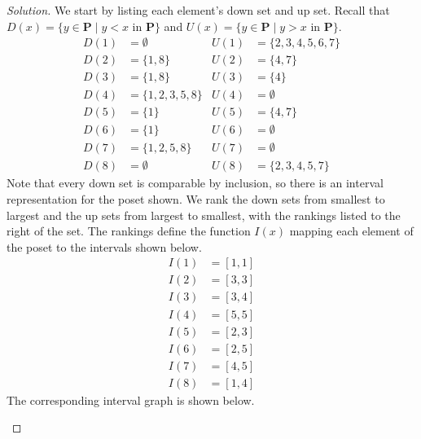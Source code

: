 \documentclass[12pt]{article}
\theoremstyle{definition}
\newenvironment{solution}{
  \begin{proof}[Solution]
    \vspace{-8px}
    \setlength{\parskip}{4px}
    \setlength{\parindent}{0px}
}{
\end{proof}
}
\begin{document}
  \begin{solution}
    We start by listing each element's down set and up set.
    Recall that \(D \left( x \right) = \{y \in \textbf{P} \mid y < x \text{ in } \textbf{P}\}\) and \(U \left( x \right) = \{y \in \textbf{P} \mid y > x \text{ in } \textbf{P}\}\).
    \begin{align*}
      D \left( 1 \right) &= \emptyset & U \left( 1 \right) &= \{2, 3, 4, 5, 6, 7\} \\
      D \left( 2 \right) &= \{1, 8\} & U \left( 2 \right) &= \{4, 7\} \\
      D \left( 3 \right) &= \{1, 8\} & U \left( 3 \right) &= \{4\} \\
      D \left( 4 \right) &= \{1, 2, 3, 5, 8\} & U \left( 4 \right) &= \emptyset \\
      D \left( 5 \right) &= \{1\} & U \left( 5 \right) &= \{4, 7\} \\
      D \left( 6 \right) &= \{1\} & U \left( 6 \right) &= \emptyset \\
      D \left( 7 \right) &= \{1, 2, 5, 8\} & U \left( 7 \right) &= \emptyset \\
      D \left( 8 \right) &= \emptyset & U \left( 8 \right) &= \{2, 3, 4, 5, 7\}
    \end{align*}
    Note that every down set is comparable by inclusion, so there is an interval representation for the poset shown.
    We rank the down sets from smallest to largest and the up sets from largest to smallest, with the rankings listed to the right of the set.
    The rankings define the function \(I\left( x \right)\) mapping each element of the poset to the intervals shown below.
    \begin{align*}
      I\left( 1 \right) &= [1, 1] \\
      I\left( 2 \right) &= [3, 3] \\
      I\left( 3 \right) &= [3, 4] \\
      I\left( 4 \right) &= [5, 5] \\
      I\left( 5 \right) &= [2, 3] \\
      I\left( 6 \right) &= [2, 5] \\
      I\left( 7 \right) &= [4, 5] \\
      I\left( 8 \right) &= [1, 4]
    \end{align*}
    The corresponding interval graph is shown below.
    \begin{figure}[H]
      \centering
      \begin{tikzpicture}


\end{tikzpicture}
\end{figure}
\end{solution}
\end{document}
